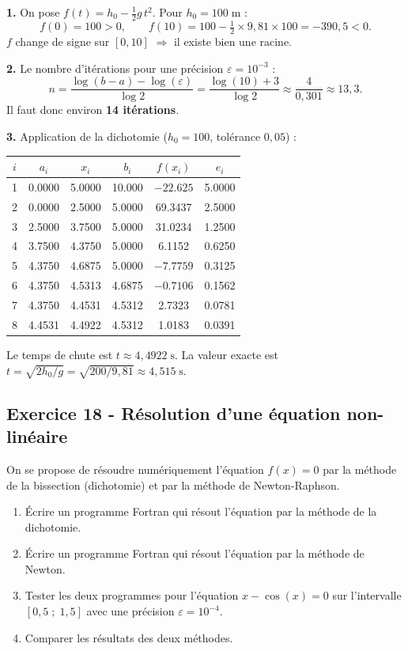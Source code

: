 \documentclass[12pt,a4paper]{article}
\begin{document}
\begin{boitecorrige}
\textbf{1.} On pose $f(t) = h_0 - \tfrac{1}{2}g\,t^2$. Pour $h_0 = 100\;\text{m}$ :
\[
f(0) = 100 > 0, \qquad f(10) = 100 - \tfrac{1}{2}\times9{,}81\times100 = -390{,}5 < 0.
\]
$f$ change de signe sur $[0,10]$ $\Rightarrow$ il existe bien une racine.

\textbf{2.} Le nombre d'itérations pour une précision $\varepsilon = 10^{-3}$ :
\[
n = \frac{\log(b-a) - \log(\varepsilon)}{\log 2} = \frac{\log(10) + 3}{\log 2} \approx \frac{4}{0{,}301} \approx 13{,}3.
\]
Il faut donc environ \textbf{14 itérations}.

\textbf{3.} Application de la dichotomie ($h_0=100$, tolérance $0{,}05$) :

\begin{center}
\begin{tabular}{|c|c|c|c|c|c|}
\hline
$i$ & $a_i$ & $x_i$ & $b_i$ & $f(x_i)$ & $e_i$ \\
\hline
1 & 0.0000 & 5.0000 & 10.000 & $-22.625$ & 5.0000 \\
2 & 0.0000 & 2.5000 & 5.0000 & 69.3437 & 2.5000 \\
3 & 2.5000 & 3.7500 & 5.0000 & 31.0234 & 1.2500 \\
4 & 3.7500 & 4.3750 & 5.0000 & 6.1152 & 0.6250 \\
5 & 4.3750 & 4.6875 & 5.0000 & $-7.7759$ & 0.3125 \\
6 & 4.3750 & 4.5313 & 4.6875 & $-0.7106$ & 0.1562 \\
7 & 4.3750 & 4.4531 & 4.5312 & 2.7323 & 0.0781 \\
8 & 4.4531 & 4.4922 & 4.5312 & 1.0183 & 0.0391 \\
\hline
\end{tabular}
\end{center}
Le temps de chute est $t \approx 4{,}4922\;\text{s}$. La valeur exacte est $t = \sqrt{2h_0/g} = \sqrt{200/9{,}81} \approx 4{,}515\;\text{s}$.
\end{boitecorrige}

\subsection*{Exercice 18 - Résolution d'une équation non-linéaire \niveau{\difficile}}

\begin{boiteexercice}
On se propose de résoudre numériquement l'équation $f(x) = 0$ par la méthode de la bissection (dichotomie) et par la méthode de Newton-Raphson.
\begin{enumerate}
  \item Écrire un programme Fortran qui résout l'équation par la méthode de la dichotomie.
  \item Écrire un programme Fortran qui résout l'équation par la méthode de Newton.
  \item Tester les deux programmes pour l'équation $x - \cos(x) = 0$ sur l'intervalle $[0{,}5\;;\;1{,}5]$ avec une précision $\varepsilon = 10^{-4}$.
  \item Comparer les résultats des deux méthodes.
\end{enumerate}
\end{boiteexercice}
\end{document}
